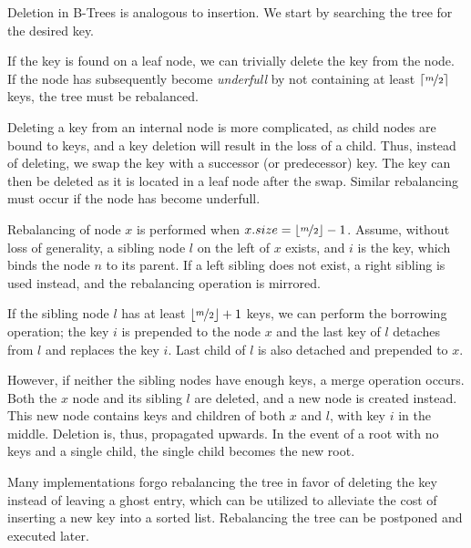 Deletion in B-Trees is analogous to insertion. We start by searching the tree for the desired key.

If the key is found on a leaf node, we can trivially delete the key from the node. If the node has subsequently become \textit{underfull} by not containing at least $\lceil\nicefrac{m}{2}\rceil$ keys, the tree must be rebalanced.

Deleting a key from an internal node is more complicated, as child nodes are bound to keys, and a key deletion will result in the loss of a child. Thus, instead of deleting, we swap the key with a successor (or predecessor) key. The key can then be deleted as it is located in a leaf node after the swap. Similar rebalancing must occur if the node has become underfull.

Rebalancing of node $x$ is performed when $x.size = \lfloor\nicefrac{m}{2}\rfloor - 1$. Assume, without loss of generality, a sibling node $l$ on the left of $x$ exists, and $i$ is the key, which binds the node $n$ to its parent. If a left sibling does not exist, a right sibling is used instead, and the rebalancing operation is mirrored.

If the sibling node $l$ has at least $\lfloor\nicefrac{m}{2}\rfloor + 1$ keys, we can perform the borrowing operation; the key $i$ is prepended to the node $x$ and the last key of $l$ detaches from $l$ and replaces the key $i$. Last child of $l$ is also detached and prepended to $x$.

However, if neither the sibling nodes have enough keys, a merge operation occurs. Both the $x$ node and its sibling $l$ are deleted, and a new node is created instead. This new node contains keys and children of both $x$ and $l$, with key $i$ in the middle. Deletion is, thus, propagated upwards. In the event of a root with no keys and a single child, the single child becomes the new root.

Many implementations forgo rebalancing the tree in favor of deleting the key instead of leaving a ghost entry, which can be utilized to alleviate the cost of inserting a new key into a sorted list. Rebalancing the tree can be postponed and executed later.

